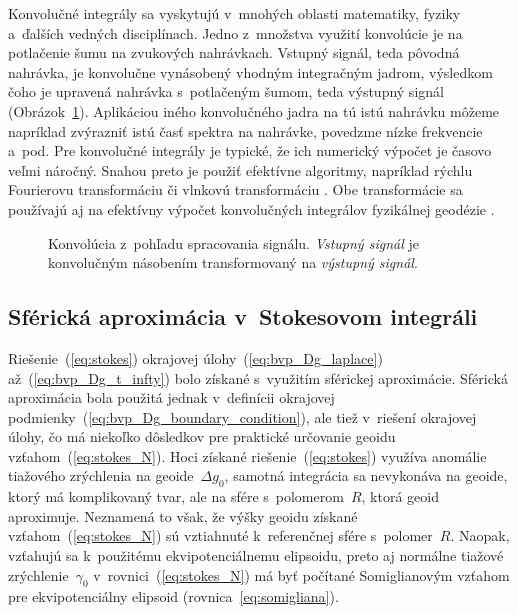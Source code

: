 \documentclass[a4paper, 12pt]{book}
\begin{document}
Konvolučné integrály sa vyskytujú v~mnohých oblasti matematiky, fyziky 
a~ďalších vedných disciplínach.  Jedno z~množstva využití konvolúcie je na 
potlačenie šumu na zvukových nahrávkach.  Vstupný signál, teda pôvodná 
nahrávka, je konvolučne vynásobený vhodným integračným jadrom, výsledkom čoho 
je upravená nahrávka s~potlačeným šumom, teda výstupný signál 
(Obrázok~\ref{fig:convolution}).  Aplikáciou iného konvolučného jadra na tú 
istú nahrávku môžeme napríklad zvýrazniť istú časť spektra na nahrávke, 
povedzme nízke frekvencie a~pod.  Pre konvolučné integrály je typické, že ich 
numerický výpočet je časovo veľmi náročný.  Snahou preto je použiť efektívne 
algoritmy, napríklad rýchlu Fourierovu transformáciu 
\parencite[napríklad][]{PressNumericalRecipes} či vlnkovú transformáciu 
\parencite[napríklad][]{KellerWavelets}.  Obe transformácie sa používajú aj na 
efektívny výpočet konvolučných integrálov fyzikálnej geodézie \parencite[pozri 
napríklad][]{Forsberg1984,Freeden1998a,SansoGeoidDetermination}.

\begin{figure}[bt]
\centering

\caption{Konvolúcia z~pohľadu spracovania signálu.  \textit{Vstupný signál} je 
konvolučným násobením transformovaný na \textit{výstupný signál}.}
\label{fig:convolution}
\end{figure}


\subsection{Sférická aproximácia v~Stokesovom integráli}
\label{sec:stokes_spherical_approximation}

Riešenie~(\ref{eq:stokes}) okrajovej úlohy~(\ref{eq:bvp_Dg_laplace}) 
až~(\ref{eq:bvp_Dg_t_infty}) bolo získané s~využitím sférickej aproximácie.  
Sférická aproximácia bola použitá jednak v~definícii okrajovej 
podmienky~(\ref{eq:bvp_Dg_boundary_condition}), ale tiež v~riešení okrajovej 
úlohy, čo má niekoľko dôsledkov pre praktické určovanie geoidu 
vzťahom~(\ref{eq:stokes_N}).  Hoci získané riešenie~(\ref{eq:stokes}) využíva 
anomálie tiažového zrýchlenia na geoide~$\Delta g_0$, samotná integrácia sa 
nevykonáva na geoide, ktorý má komplikovaný tvar, ale na sfére s~polomerom~$R$, 
ktorá geoid aproximuje.  Neznamená to však, že výšky geoidu získané 
vzťahom~(\ref{eq:stokes_N}) sú vztiahnuté k~referenčnej sfére s~polomer~$R$.  
Naopak, vzťahujú sa k~použitému ekvipotenciálnemu elipsoidu, preto aj normálne 
tiažové zrýchlenie~$\gamma_0$ v~rovnici~(\ref{eq:stokes_N}) má byť počítané 
Somiglianovým vzťahom pre ekvipotenciálny elipsoid 
(rovnica~\ref{eq:somigliana}).
\end{document}
